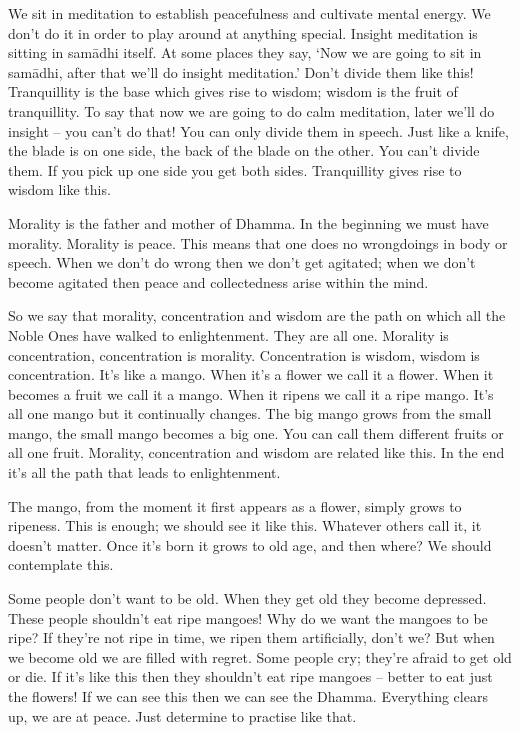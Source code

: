 We sit in meditation to establish peacefulness and cultivate mental energy. We don't do it in order to play around at anything special. Insight meditation is sitting in sam\=adhi itself. At some places they say, `Now we are going to sit in sam\=adhi, after that we'll do insight meditation.' Don't divide them like this! Tranquillity is the base which gives rise to wisdom; wisdom is the fruit of tranquillity. To say that now we are going to do calm meditation, later we'll do insight -- you can't do that! You can only divide them in speech. Just like a knife, the blade is on one side, the back of the blade on the other. You can't divide them. If you pick up one side you get both sides. Tranquillity gives rise to wisdom like this.

Morality is the father and mother of Dhamma. In the beginning we must have morality. Morality is peace. This means that one does no wrongdoings in body or speech. When we don't do wrong then we don't get agitated; when we don't become agitated then peace and collectedness arise within the mind.

So we say that morality, concentration and wisdom are the path on which all the Noble Ones have walked to enlightenment. They are all one. Morality is concentration, concentration is morality. Concentration is wisdom, wisdom is concentration. It's like a mango. When it's a flower we call it a flower. When it becomes a fruit we call it a mango. When it ripens we call it a ripe mango. It's all one mango but it continually changes. The big mango grows from the small mango, the small mango becomes a big one. You can call them different fruits or all one fruit. Morality, concentration and wisdom are related like this. In the end it's all the path that leads to enlightenment.

The mango, from the moment it first appears as a flower, simply grows to ripeness. This is enough; we should see it like this. Whatever others call it, it doesn't matter. Once it's born it grows to old age, and then where? We should contemplate this.

Some people don't want to be old. When they get old they become depressed. These people shouldn't eat ripe mangoes! Why do we want the mangoes to be ripe? If they're not ripe in time, we ripen them artificially, don't we? But when we become old we are filled with regret. Some people cry; they're afraid to get old or die. If it's like this then they shouldn't eat ripe mangoes -- better to eat just the flowers! If we can see this then we can see the Dhamma. Everything clears up, we are at peace. Just determine to practise like that.

